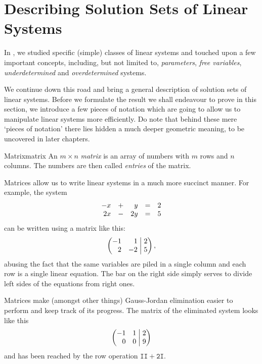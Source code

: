 \section{Describing Solution Sets of Linear Systems}
\label{sec:describing-solution-sets-of-linear-systems}

In , we studied specific (simple) classes of
linear systems and touched upon a few important concepts, including, but not
limited to, \emph{parameters}, \emph{free variables}, \emph{underdetermined} and
\emph{overdetermined} systems.

We continue down this road and bring a general description of solution sets of
linear systems. Before we formulate the result we shall endeavour to prove in
this section, we introduce a few pieces of notation which are going to allow us
to manipulate linear systems more efficiently. Do note that behind these mere
`pieces of notation' there lies hidden a much deeper geometric meaning, to be
uncovered in later chapters.

\begin{definition}{Matrix}{matrix}
 An $m \times n$ \emph{matrix} is an array of numbers with $m$ rows and $n$
 columns. The numbers are then called \emph{entries} of the matrix.
\end{definition}

Matrices allow us to write linear systems in a much more succinct manner. For
example, the system
\[
 \begin{array}{r c r c r}
  -x & + & y & = & 2\\
  2x & - & 2y & = & 5
 \end{array}
\]
can be written using a matrix like this:
\[
 \left(
  \begin{matrix*}[r]
   -1 & 1\\
   2 & -2
  \end{matrix*}
  \hspace{1mm}
 \right|
 \left.
  \begin{matrix*}[r]
   2\\
   5
  \end{matrix*}
 \right),
\]
abusing the fact that the same variables are piled in a single column and each
row is a single linear equation. The bar on the right side simply serves to
divide left sides of the equations from right ones.

Matrices make (amongst other things) Gauss-Jordan elimination easier to perform
and keep track of its progress. The matrix of the eliminated system looks like
this
\[
 \left(
  \begin{matrix*}[r]
   -1 & 1\\
   0 & 0
  \end{matrix*}
  \hspace{1mm}
 \right|
 \left.
  \begin{matrix*}[r]
   2\\
   9
  \end{matrix*}
 \right)
\]
and has been reached by the row operation $\mathtt{II + 2I}$.

